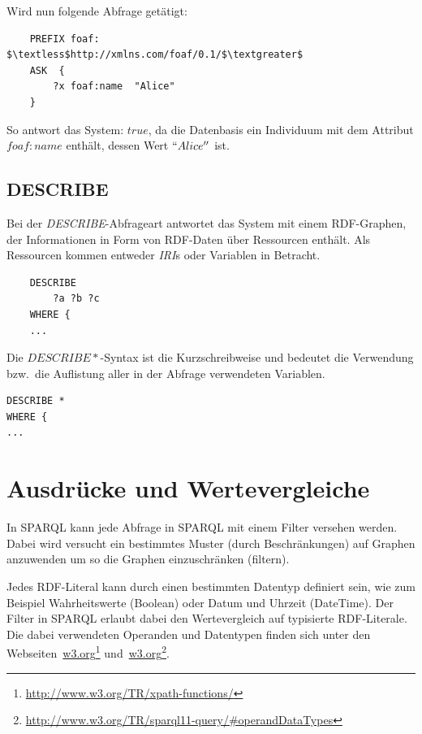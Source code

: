 Wird nun folgende Abfrage getätigt:
\lstset{language=XML}
\begin{lstlisting}
    PREFIX foaf:    $\textless$http://xmlns.com/foaf/0.1/$\textgreater$
    ASK  { 
        ?x foaf:name  "Alice"
    }
\end{lstlisting}
So antwort das System: $true$, da die Datenbasis ein Individuum mit dem Attribut $foaf:name$ enthält, dessen Wert $``Alice''$ ist.

\subsection{DESCRIBE}
\label{subsec:sparql_abfragearten_describe}
Bei der \textit{DESCRIBE}-Abfrageart antwortet das System mit einem RDF-Graphen, der Informationen in Form von RDF-Daten über Ressourcen enthält. Als Ressourcen kommen entweder \textit{IRI}s oder Variablen in Betracht.

\begin{lstlisting}
    DESCRIBE
        ?a ?b ?c
    WHERE {
    ...
\end{lstlisting}

Die $ DESCRIBE * $-Syntax ist die Kurzschreibweise und bedeutet die Verwendung bzw.\ die Auflistung aller in der Abfrage verwendeten Variablen.
\begin{lstlisting}
DESCRIBE *
WHERE {
...
\end{lstlisting}

\section{Ausdrücke und Wertevergleiche}
\label{sec:sparql_ausdruecke}
In SPARQL kann jede Abfrage in SPARQL mit einem Filter versehen werden. Dabei wird versucht ein bestimmtes Muster (durch Beschränkungen) auf Graphen anzuwenden um so die Graphen einzuschränken (filtern).

Jedes RDF-Literal kann durch einen bestimmten Datentyp definiert sein, wie zum Beispiel Wahrheitswerte (Boolean) oder Datum und Uhrzeit (DateTime). Der Filter in SPARQL erlaubt dabei den Wertevergleich auf typisierte RDF-Literale. Die dabei verwendeten Operanden und Datentypen finden sich unter den Webseiten~\href{http://www.w3.org/TR/xpath-functions/}{w3.org}\footnote{\url{http://www.w3.org/TR/xpath-functions/}} und~\href{http://www.w3.org/TR/sparql11-query/\#operandDataTypes}{w3.org}\footnote{\url{http://www.w3.org/TR/sparql11-query/\#operandDataTypes}}.

